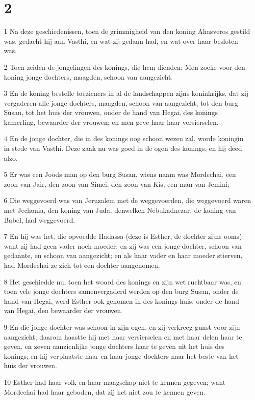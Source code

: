 \chapter{2}

\par 1 Na deze geschiedenissen, toen de grimmigheid van den koning Ahasveros gestild was, gedacht hij aan Vasthi, en wat zij gedaan had, en wat over haar besloten was.
\par 2 Toen zeiden de jongelingen des konings, die hem dienden: Men zoeke voor den koning jonge dochters, maagden, schoon van aangezicht.
\par 3 En de koning bestelle toezieners in al de landschappen zijns koninkrijks, dat zij vergaderen alle jonge dochters, maagden, schoon van aangezicht, tot den burg Susan, tot het huis der vrouwen, onder de hand van Hegai, des konings kamerling, bewaarder der vrouwen; en men geve haar haar versierselen.
\par 4 En de jonge dochter, die in des konings oog schoon wezen zal, worde koningin in stede van Vasthi. Deze zaak nu was goed in de ogen des konings, en hij deed alzo.
\par 5 Er was een Joods man op den burg Susan, wiens naam was Mordechai, een zoon van Jair, den zoon van Simei, den zoon van Kis, een man van Jemini;
\par 6 Die weggevoerd was van Jeruzalem met de weggevoerden, die weggevoerd waren met Jechonia, den koning van Juda, denwelken Nebukadnezar, de koning van Babel, had weggevoerd.
\par 7 En hij was het, die opvoedde Hadassa (deze is Esther, de dochter zijns ooms); want zij had geen vader noch moeder; en zij was een jonge dochter, schoon van gedaante, en schoon van aangezicht; en als haar vader en haar moeder stierven, had Mordechai ze zich tot een dochter aangenomen.
\par 8 Het geschiedde nu, toen het woord des konings en zijn wet ruchtbaar was, en toen vele jonge dochters samenvergaderd werden op den burg Susan, onder de hand van Hegai, werd Esther ook genomen in des konings huis, onder de hand van Hegai, den bewaarder der vrouwen.
\par 9 En die jonge dochter was schoon in zijn ogen, en zij verkreeg gunst voor zijn aangezicht; daarom haastte hij met haar versierselen en met haar delen haar te geven, en zeven aanzienlijke jonge dochters haar te geven uit het huis des konings; en hij verplaatste haar en haar jonge dochters naar het beste van het huis der vrouwen.
\par 10 Esther had haar volk en haar maagschap niet te kennen gegeven; want Mordechai had haar geboden, dat zij het niet zou te kennen geven.
